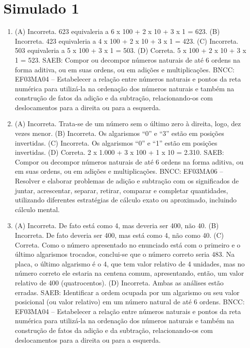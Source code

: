\section*{Simulado 1}


\begin{enumerate}
\item
(A) Incorreta. 623 equivaleria a 6 x 100 + 2 x 10 + 3 x 1 = 623.
(B) Incorreta. 423 equivaleria a 4 x 100 + 2 x 10 + 3 x 1 = 423.
(C) Incorreta. 503 equivaleria a 5 x 100 + 3 x 1 = 503.
(D) Correta. 5 x 100 + 2 x 10 + 3 x 1 = 523.
SAEB: Compor ou decompor números naturais de até 6 ordens na forma aditiva, ou em suas ordens, ou em adições e multiplicações.
BNCC: EF03MA04 -- Estabelecer a relação entre números naturais e pontos da reta numérica para
utilizá-la na ordenação dos números naturais e também na construção de fatos da adição e da
subtração, relacionando-os com deslocamentos para a direita ou para a esquerda.

\item
(A) Incorreta. Trata-se de um número sem o último zero à direita, logo, dez vezes menor.
(B) Incorreta. Os algarismos ``0'' e ``3'' estão em posições invertidas.
(C) Incorreta. Os algarismos ``0'' e ``1'' estão em posições invertidas.
(D) Correta. 2 x 1.000 + 3 x 100 + 1 x 10 = 2.310.
SAEB: Compor ou decompor números naturais de até 6 ordens na
forma aditiva, ou em suas ordens, ou em adições e multiplicações.
BNCC: EF03MA06 – Resolver e elaborar problemas de adição e subtração com os significados de
juntar, acrescentar, separar, retirar, comparar e completar quantidades, utilizando diferentes
estratégias de cálculo exato ou aproximado, incluindo cálculo mental.

\item
(A) Incorreta. De fato está como 4, mas deveria ser 400, não 40.
(B) Incorreta. De fato deveria ser 400, mas está como 4, não como 40.
(C) Correta. Como o número apresentado no enunciado está com o primeiro e o último
algarismos trocados, conclui-se que o número correto seria 483. Na placa,
o último algarismo é o 4, que tem valor relativo de 4 unidades, mas no
número correto ele estaria na centena comum, apresentando, então, um valor
relativo de 400 (quatrocentos).
(D) Incorreta. Ambas as análises estão erradas.
SAEB: Identificar a ordem ocupada por um algarismo ou seu
valor posicional (ou valor relativo) em um número natural de até 6
ordens.
BNCC: EF03MA04 -- Estabelecer a relação entre números naturais e pontos da reta numérica para
utilizá-la na ordenação dos números naturais e também na construção de fatos da adição e da
subtração, relacionando-os com deslocamentos para a direita ou para a esquerda.


\end{enumerate}
